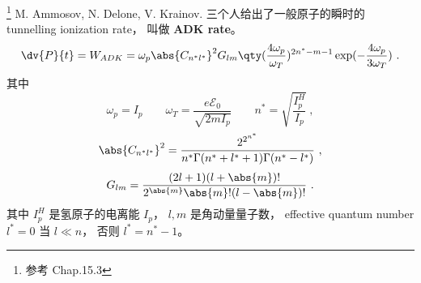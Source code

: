 
\begin{issues}
\issueDraft
\end{issues}

\footnote{参考 \cite{Bransden} Chap.15.3} M. Ammosov, N. Delone, V. Krainov. 三个人给出了一般原子的瞬时的 tunnelling ionization rate， 叫做 \textbf{ADK rate}。
\begin{equation}
\dv{P}{t} = W_{ADK} = \omega_p \abs{C_{n^*l^*}}^2 G_{lm}\qty(\frac{4\omega_p}{\omega_T})^{2n^*-m-1}\exp(-\frac{4\omega_p}{3\omega_T})~.
\end{equation}
其中
\begin{equation}
\omega_p = I_p \qquad \omega_T = \frac{e\mathcal E_0}{\sqrt{2mI_p}} \qquad
n^* = \sqrt{\frac{I_p^H}{I_p}}~,
\end{equation}
\begin{equation}
\abs{C_{n^*l^*}}^2 = \frac{2^{2^{n^*}}}{n^* \Gamma(n^* + l^* + 1) \Gamma(n^* - l^*)}~,
\end{equation}
\begin{equation}
G_{lm} = \frac{(2l+1)(l+\abs{m})!}{2^{\abs{m}}\abs{m}!(l-\abs{m})!}~.
\end{equation}
其中 $I_p^H$ 是氢原子的电离能 $I_p$， $l,m$ 是角动量量子数， effective quantum number $l^* = 0$ 当 $l\ll n$， 否则 $l^* = n^*-1$。